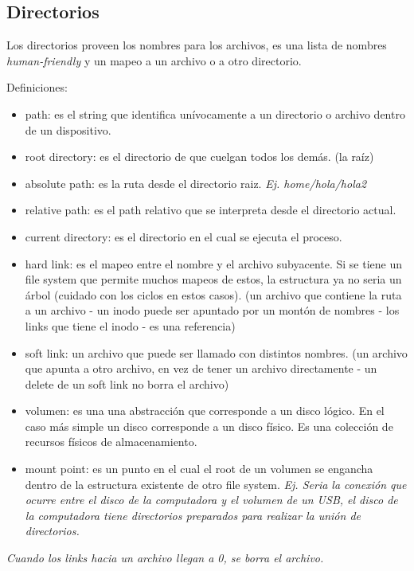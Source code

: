 \documentclass[titlepage,a4paper]{article}
\begin{document}
\subsection*{Directorios}
Los directorios proveen los nombres para los archivos, es una lista de nombres \emph{human-friendly} y un mapeo a un archivo o a otro directorio.


Definiciones:
\begin{itemize}
    \item path: es el string que identifica unívocamente a un directorio o archivo dentro de un dispositivo.
    \item root directory: es el directorio de que cuelgan todos los demás. (la raíz)
    \item absolute path: es la ruta desde el directorio raiz. \textit{Ej. home/hola/hola2}
    \item relative path: es el path relativo que se interpreta desde el directorio actual.
    \item current directory: es el directorio en el cual se ejecuta el proceso.
    \item hard link: es el mapeo entre el nombre y el archivo subyacente. Si se tiene un file system que permite muchos mapeos de estos, la estructura ya no seria un árbol (cuidado con los ciclos en estos casos). (un archivo que contiene la ruta a un archivo - un inodo puede ser apuntado por un montón de nombres - los links que tiene el inodo - es una referencia)
    \item soft link: un archivo que puede ser llamado con distintos nombres. (un archivo que apunta a otro archivo, en vez de tener un archivo directamente - un delete de un soft link no borra el archivo)
    
    \item volumen: es una una abstracción que corresponde a un disco lógico. En el caso más simple un disco corresponde a un disco físico. Es una colección de recursos físicos de almacenamiento.
    \item mount point: es un punto en el cual el root de un volumen se engancha dentro de la estructura existente de otro file system. \textit{Ej. Seria la conexión que ocurre entre el disco de la computadora y el volumen de un USB, el disco de la computadora tiene directorios preparados para realizar la unión de directorios.}
    
\end{itemize}

\textit{Cuando los links hacia un archivo llegan a 0, se borra el archivo.}
\end{document}

